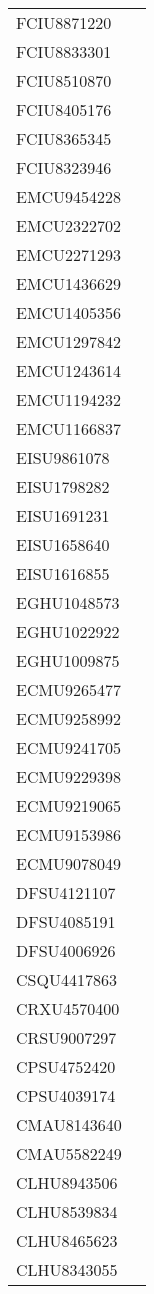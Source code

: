 \documentclass[a4paper]{report}
\begin{document}
\begin{longtable}{| p{4cm} | p{10cm} |}
	FCIU8871220  &  \\
	FCIU8833301  &  \\
	FCIU8510870  &  \\
	FCIU8405176  &  \\
	FCIU8365345  &  \\
	FCIU8323946  &  \\
	EMCU9454228  &  \\
	EMCU2322702  &  \\
	EMCU2271293  &  \\
	EMCU1436629  &  \\
	EMCU1405356  &  \\
	EMCU1297842  &  \\
	EMCU1243614  &  \\
	EMCU1194232  &  \\
	EMCU1166837  &  \\
	EISU9861078  &  \\
	EISU1798282  &  \\
	EISU1691231  &  \\
	EISU1658640  &  \\
	EISU1616855  &  \\
	EGHU1048573  &  \\
	EGHU1022922  &  \\
	EGHU1009875  &  \\
	ECMU9265477  &  \\
	ECMU9258992  &  \\
	ECMU9241705  &  \\
	ECMU9229398  &  \\
	ECMU9219065  &  \\
	ECMU9153986  &  \\
	ECMU9078049  &  \\
	DFSU4121107  &  \\
	DFSU4085191  &  \\
	DFSU4006926  &  \\
	CSQU4417863  &  \\
	CRXU4570400  &  \\
	CRSU9007297  &  \\
	CPSU4752420  &  \\
	CPSU4039174  &  \\
	CMAU8143640  &  \\
	CMAU5582249  &  \\
	CLHU8943506  &  \\
	CLHU8539834  &  \\
	CLHU8465623  &  \\
	CLHU8343055  &  \\

\end{longtable}
\end{document}
